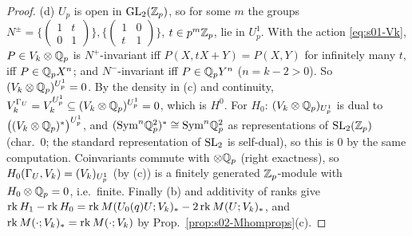 \begin{proof}
(d) $U_p$ is open in $\mathrm{GL}_2(\mathbb{Z}_p)$, so for some $m$ the groups $N^\pm=\{(\begin{smallmatrix}1&t\\0&1\end{smallmatrix})\},\{(\begin{smallmatrix}1&0\\t&1\end{smallmatrix})\}$, $t\in p^m\mathbb{Z}_p$, lie in
$U^1_p$. With the action \eqref{eq:s01-Vk}, $P\in V_k\otimes\mathbb{Q}_p$ is $N^+$-invariant iff $P(X,tX+Y)=P(X,Y)$ for infinitely many $t$, iff $P\in\mathbb{Q}_p X^n$; and $N^-$-invariant iff
$P\in\mathbb{Q}_p Y^n$ ($n=k-2>0$). So $(V_k\otimes\mathbb{Q}_p)^{U^1_p}=0$. By the density in (c) and continuity, $V_k^{\Gamma_U}=V_k^{U^1_p}\subseteq(V_k\otimes\mathbb{Q}_p)^{U^1_p}=0$, which is $H^0$. For $H_0$:
$(V_k\otimes\mathbb{Q}_p)_{U^1_p}$ is dual to $\big((V_k\otimes\mathbb{Q}_p)^*\big)^{U_p^1}$, and $(\mathrm{Sym}^n\mathbb{Q}_p^2)^*\cong\mathrm{Sym}^n\mathbb{Q}_p^2$ as representations of $\mathrm{SL}_2(\mathbb{Z}_p)$ (char.\ $0$; the standard
representation of $\mathrm{SL}_2$ is self-dual), so this is $0$ by the same computation. Coinvariants commute with $\otimes\mathbb{Q}_p$ (right exactness), so
$H_0(\Gamma_U,V_k)=(V_k)_{U^1_p}$ (by (c)) is a finitely generated $\mathbb{Z}_p$-module with $H_0\otimes\mathbb{Q}_p=0$, i.e.\ finite. Finally (b) and additivity of ranks give
$\operatorname{rk} H_1-\operatorname{rk} H_0=\operatorname{rk}M(U_0(q)U;V_k)_*-2\operatorname{rk}M(U;V_k)_*$, and $\operatorname{rk}M(\cdot;V_k)_*=\operatorname{rk}M(\cdot;V_k)$ by Prop.~\ref{prop:s02-Mhomprops}(c).
\end{proof}

